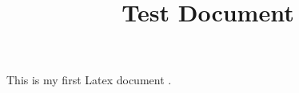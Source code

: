 \documentclass {article}
\begin{document}
\title{Test Document}
\maketitle

This is my first Latex document \cite{feller2002understanding}.



\end{document}
